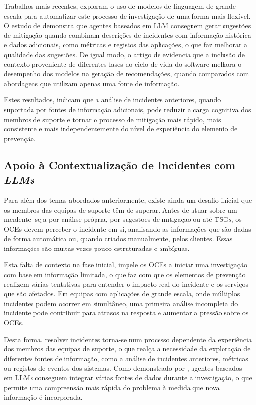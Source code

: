 		Trabalhos mais recentes, exploram o uso de modelos de linguagem de grande escala para automatizar este processo de investigação de uma forma mais flexível. O estudo de \textcite{Reference1} demonstra que agentes baseados em \gls{LLM} conseguem gerar sugestões de mitigação quando combinam descrições de incidentes com informação histórica e dados adicionais, como métricas e registos das aplicações, o que faz melhorar a qualidade das sugestões. De igual modo, o artigo de \textcite{Reference4} evidencia que a inclusão de contexto proveniente de diferentes fases do ciclo de vida do software melhora o desempenho dos modelos na geração de recomendações, quando comparados com abordagens que utilizam apenas uma fonte de informação.
		
		Estes resultados, indicam que a análise de incidentes anteriores, quando suportada por fontes de informação adicionais, pode reduzir a carga cognitiva dos membros de suporte e tornar o processo de mitigação mais rápido, mais consistente e mais independentemente do nível de experiência do elemento de prevenção.
		
	
	\subsection{Apoio à Contextualização de Incidentes com \textit{LLMs}}
	
		Para além dos temas abordados anteriormente, existe ainda um desafio inicial que os membros das equipas de suporte têm de superar. Antes de atuar sobre um incidente, seja por análise própria, por sugestões de mitigação ou até \gls{TSG}\textit{s}, os \gls{OCEs} devem perceber o incidente em si, analisando as informações que são dadas de forma automática ou, quando criados manualmente, pelos clientes. Essas informações são muitas vezes pouco estruturadas e ambíguas.
		
		Esta falta de contexto na fase inicial, impele os \gls{OCEs} a iniciar uma investigação com base em informação limitada, o que faz com que os elementos de prevenção realizem várias tentativas para entender o impacto real do incidente e os serviços que são afetados. Em equipas com aplicações de grande escala, onde múltiplos incidentes podem ocorrer em simultâneo, uma primeira análise incompleta do incidente pode contribuir para atrasos na resposta e aumentar a pressão sobre os \gls{OCEs}.
		
		Desta forma, resolver incidentes torna-se num processo dependente da experiência dos membros das equipas de suporte, o que realça a necessidade da exploração de diferentes fontes de informação, como a análise de incidentes anteriores, métricas ou registos de eventos dos sistemas. Como demonstrado por \textcite{Reference1}, agentes baseados em \gls{LLM}\textit{s} conseguem integrar várias fontes de dados durante a investigação, o que permite uma compreensão mais rápida do problema à medida que nova informação é incorporada.
		
